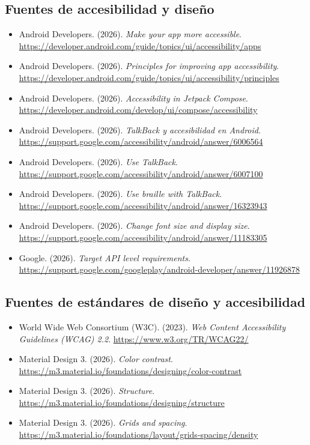 \subsection*{Fuentes de accesibilidad y diseño}
{\small
\begin{itemize}[leftmargin=*,itemsep=0.1em,label={}]
  \item Android Developers. (2026). \emph{Make your app more accessible}. \url{https://developer.android.com/guide/topics/ui/accessibility/apps}
  \item Android Developers. (2026). \emph{Principles for improving app accessibility}. \url{https://developer.android.com/guide/topics/ui/accessibility/principles}
  \item Android Developers. (2026). \emph{Accessibility in Jetpack Compose}. \url{https://developer.android.com/develop/ui/compose/accessibility}
  \item Android Developers. (2026). \emph{TalkBack y accesibilidad en Android}. \url{https://support.google.com/accessibility/android/answer/6006564}
  \item Android Developers. (2026). \emph{Use TalkBack}. \url{https://support.google.com/accessibility/android/answer/6007100}
  \item Android Developers. (2026). \emph{Use braille with TalkBack}. \url{https://support.google.com/accessibility/android/answer/16323943}
  \item Android Developers. (2026). \emph{Change font size and display size}. \url{https://support.google.com/accessibility/android/answer/11183305}
  \item Google. (2026). \emph{Target API level requirements}. \url{https://support.google.com/googleplay/android-developer/answer/11926878}
\end{itemize}
}

\subsection*{Fuentes de estándares de diseño y accesibilidad}
{\small
\begin{itemize}[leftmargin=*,itemsep=0.1em,label={}]
  \item World Wide Web Consortium (W3C). (2023). \emph{Web Content Accessibility Guidelines (WCAG) 2.2}. \url{https://www.w3.org/TR/WCAG22/}
  \item Material Design 3. (2026). \emph{Color contrast}. \url{https://m3.material.io/foundations/designing/color-contrast}
  \item Material Design 3. (2026). \emph{Structure}. \url{https://m3.material.io/foundations/designing/structure}
  \item Material Design 3. (2026). \emph{Grids and spacing}. \url{https://m3.material.io/foundations/layout/grids-spacing/density}
\end{itemize}
}

